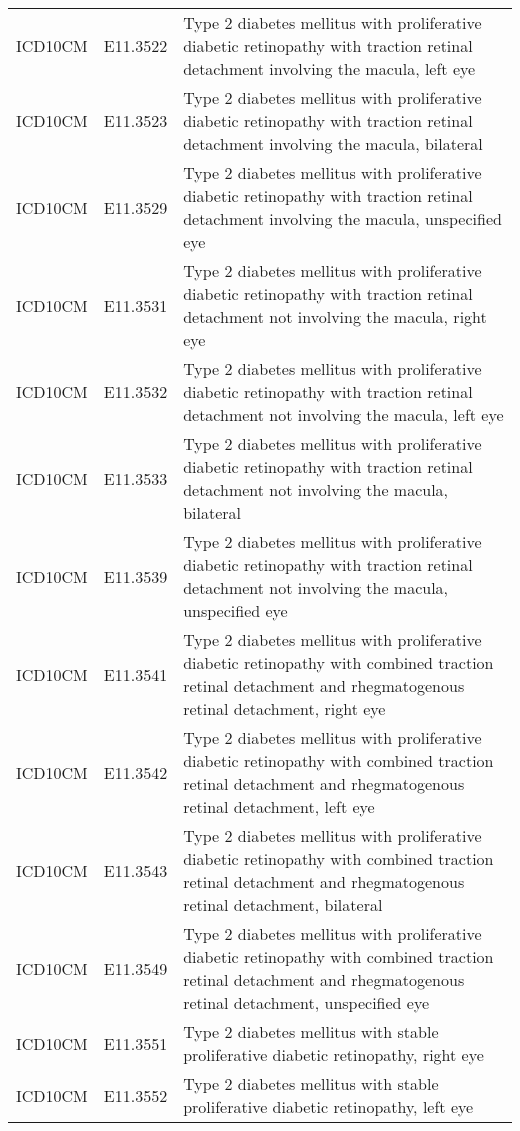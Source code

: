 \begin{longtable}{p{}p{}p{}}
  ICD10CM & E11.3522 & Type 2 diabetes mellitus with proliferative diabetic retinopathy with traction retinal detachment involving the macula, left eye \\ 
  ICD10CM & E11.3523 & Type 2 diabetes mellitus with proliferative diabetic retinopathy with traction retinal detachment involving the macula, bilateral \\ 
  ICD10CM & E11.3529 & Type 2 diabetes mellitus with proliferative diabetic retinopathy with traction retinal detachment involving the macula, unspecified eye \\ 
  ICD10CM & E11.3531 & Type 2 diabetes mellitus with proliferative diabetic retinopathy with traction retinal detachment not involving the macula, right eye \\ 
  ICD10CM & E11.3532 & Type 2 diabetes mellitus with proliferative diabetic retinopathy with traction retinal detachment not involving the macula, left eye \\ 
  ICD10CM & E11.3533 & Type 2 diabetes mellitus with proliferative diabetic retinopathy with traction retinal detachment not involving the macula, bilateral \\ 
  ICD10CM & E11.3539 & Type 2 diabetes mellitus with proliferative diabetic retinopathy with traction retinal detachment not involving the macula, unspecified eye \\ 
  ICD10CM & E11.3541 & Type 2 diabetes mellitus with proliferative diabetic retinopathy with combined traction retinal detachment and rhegmatogenous retinal detachment, right eye \\ 
  ICD10CM & E11.3542 & Type 2 diabetes mellitus with proliferative diabetic retinopathy with combined traction retinal detachment and rhegmatogenous retinal detachment, left eye \\ 
  ICD10CM & E11.3543 & Type 2 diabetes mellitus with proliferative diabetic retinopathy with combined traction retinal detachment and rhegmatogenous retinal detachment, bilateral \\ 
  ICD10CM & E11.3549 & Type 2 diabetes mellitus with proliferative diabetic retinopathy with combined traction retinal detachment and rhegmatogenous retinal detachment, unspecified eye \\ 
  ICD10CM & E11.3551 & Type 2 diabetes mellitus with stable proliferative diabetic retinopathy, right eye \\ 
  ICD10CM & E11.3552 & Type 2 diabetes mellitus with stable proliferative diabetic retinopathy, left eye \\ 

\end{longtable}
